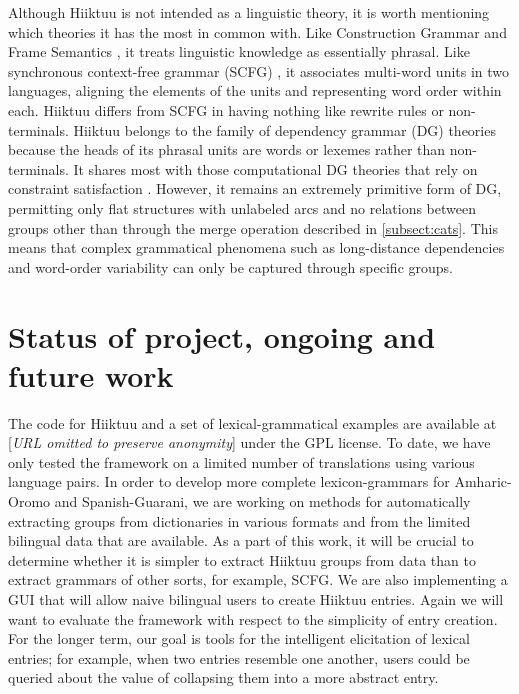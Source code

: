 \documentclass[11pt, a4paper]{article}
\begin{document}
Although Hiiktuu is not intended as a linguistic theory, it is worth
mentioning which theories it has the most in common with.
Like Construction Grammar \cite{steels} and Frame Semantics \cite{fillmoreFS},
it treats linguistic knowledge as essentially phrasal.
Like synchronous context-free grammar (SCFG) \cite{chiang}, it associates multi-word units in
two languages, aligning the elements of the units and representing word order within each.
Hiiktuu differs from SCFG in having nothing like rewrite rules or non-terminals.
Hiiktuu belongs to the family of dependency grammar (DG) theories because the heads of its
phrasal units are words or lexemes rather than non-terminals.
It shares most with those computational DG theories that rely on
constraint satisfaction \cite{bojar04,debusmann,foth+menzel,wang+harper}.
However, it remains an extremely primitive form of DG,
permitting only flat structures with unlabeled arcs and no relations between groups
other than through the merge operation described in \ref{subsect:cats}.
This means that complex grammatical phenomena such as long-distance dependencies and
word-order variability can only be captured through specific groups.

\section{Status of project, ongoing and future work}
\label{sect:status}

The code for Hiiktuu and a set of lexical-grammatical examples
are available at [\textit{URL omitted to preserve anonymity}]
under the GPL license.
To date, we have only tested the framework on a limited number of
translations using various language pairs.
In order to develop more complete lexicon-grammars for Amharic-Oromo and
Spanish-Guarani,
we are working on methods for automatically extracting groups from
dictionaries in various formats and from the limited bilingual data that
are available.
As a part of this work, it will be crucial to determine whether
it is simpler to extract Hiiktuu groups from data than to extract
grammars of other sorts, for example, SCFG.
We are also implementing a GUI that will allow naive bilingual users to
create Hiiktuu entries.
Again we will want to evaluate the framework with respect to the simplicity
of entry creation.
For the longer term, our goal is tools for the intelligent elicitation of lexical entries;
for example, when two entries resemble one another, users could be queried about the
value of collapsing them into a more abstract entry.
\end{document}
